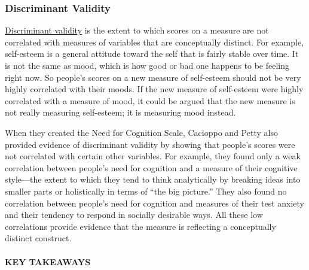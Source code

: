 \documentclass[
]{krantz}
\begin{document}
\subsubsection*{Discriminant Validity}\label{discriminant-validity}


\hyperref[discriminant-validity]{Discriminant validity} is the extent to which scores on a measure are not correlated with measures of variables that are conceptually distinct. For example, self-esteem is a general attitude toward the self that is fairly stable over time. It is not the same as mood, which is how good or bad one happens to be feeling right now. So people's scores on a new measure of self-esteem should not be very highly correlated with their moods. If the new measure of self-esteem were highly correlated with a measure of mood, it could be argued that the new measure is not really measuring self-esteem; it is measuring mood instead.

When they created the Need for Cognition Scale, Cacioppo and Petty also provided evidence of discriminant validity by showing that people's scores were not correlated with certain other variables. For example, they found only a weak correlation between people's need for cognition and a measure of their cognitive style---the extent to which they tend to think analytically by breaking ideas into smaller parts or holistically in terms of ``the big picture.'' They also found no correlation between people's need for cognition and measures of their test anxiety and their tendency to respond in socially desirable ways. All these low correlations provide evidence that the measure is reflecting a conceptually distinct construct.

\paragraph*{KEY TAKEAWAYS}\label{key-takeaways-10}
\end{document}
